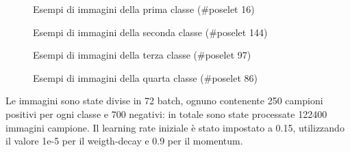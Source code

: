 \begin{figure}[h!b]
 \centering
 \hspace{3mm}
 \hspace{3mm}
 \hspace{3mm}
 \caption{Esempi di immagini della prima classe (\#poselet 16)}
 \end{figure}
 
 \begin{figure}[h!b]
 \centering
 \hspace{3mm}
 \hspace{3mm}
 \hspace{3mm}
 \caption{Esempi di immagini della seconda classe (\#poselet 144)}
 \end{figure}
 
  \begin{figure}[h!b]
 \centering
 \hspace{3mm}
 \hspace{3mm}
 \hspace{3mm}
 \caption{Esempi di immagini della terza classe (\#poselet 97)}
 \end{figure}
 
 \begin{figure}[h!b]
 \centering
 \hspace{3mm}
 \hspace{3mm}
 \hspace{3mm}
 \caption{Esempi di immagini della quarta classe (\#poselet 86)}
 \end{figure}
 
 Le immagini sono state divise in 72 batch, ognuno contenente 250 campioni positivi per ogni classe e 700 negativi: in totale sono state processate 122400 immagini campione. Il learning rate iniziale è stato impostato a 0.15, utilizzando il valore 1e-5 per il weigth-decay e 0.9 per il momentum.


